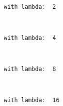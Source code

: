\documentclass[11pt]{article}
\begin{document}
    \begin{center}
    \end{center}
    { \hspace*{\fill} \\}
    
    \begin{Verbatim}[commandchars=\\\{\}]
     with lambda:  2

    \end{Verbatim}

    \begin{center}
    \end{center}
    { \hspace*{\fill} \\}
    
    \begin{Verbatim}[commandchars=\\\{\}]
     with lambda:  4

    \end{Verbatim}

    \begin{center}
    \end{center}
    { \hspace*{\fill} \\}
    
    \begin{Verbatim}[commandchars=\\\{\}]
     with lambda:  8

    \end{Verbatim}

    \begin{center}
    \end{center}
    { \hspace*{\fill} \\}
    
    \begin{Verbatim}[commandchars=\\\{\}]
     with lambda:  16

    \end{Verbatim}

    \begin{center}
    \end{center}
    { \hspace*{\fill} \\}
    
\end{document}
